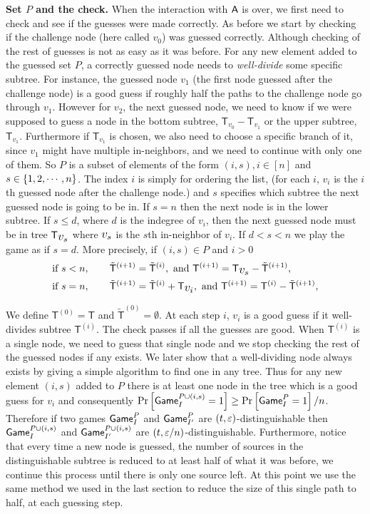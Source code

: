 \documentclass{article}
\def\A{{\sf A}}
\newcommand{\game}{{\sf Game}}
\newcommand{\T}{{\mathsf T}}
\newcommand{\dgg}[2]{\game_{#1}^{#2}}
\newcommand{\dT}{{\mathsf{T}}}
\newcommand{\bigv}[1]{\mbox{\large $v_{#1}$}}
\newcommand{\bigt}[1]{{\dT}^{({#1})}}
\newcommand{\bigtb}[1]{\tilde{\dT}^{({#1})}}
\begin{document}
  \textbf{Set $P$ and the check.} When the interaction with $\A$ is over, we first need to check and see if the guesses were made correctly. As before we start by checking if the challenge node (here called $v_0$) was guessed correctly. Although checking of the rest of guesses is not as easy as it was before. For any new element added to the guessed set $P$, a correctly guessed node needs to \textit{well-divide} some specific subtree. For instance, the guessed node $v_1$ (the first node guessed after the challenge node) is a good guess if roughly half the paths to the challenge node go through $v_1$. However for $v_2$, the next guessed node, we need to know if we were supposed to guess a node in the bottom subtree, $\T_{v_0}-\T_{v_1}$ or the upper subtree, $\T_{v_1}$. Furthermore if $\T_{v_1}$ is chosen, we also need to choose a specific branch of it, since $v_1$ might have multiple in-neighbors, and we need to continue with only one of them. So $P$ is a subset of elements of the form $(i,s), i\in [n]$ and $s \in \left\{ 1,2,\cdots,n \right\}$. The index $i$ is simply for ordering the list, (for each $i$, $v_i$ is the $i$th guessed node after the challenge node.) and $s$ specifies which subtree the next guessed node is going to be in. If $s=n$ then the next node is in the lower subtree. If $s\leq d$, where $d$ is the indegree of $v_i$, then the next guessed node must be in tree $\T_{\bigv{s} }$ where $\bigv{s}$ is the $s$th in-neighbor of $v_i$. If $d<s<n$ we play the game as if $s=d$. More precisely, if $(i,s)\in P$ and $i>0$
  \begin{align*}
&\text{if } s<n, \qquad \bigtb{i+1}=\bigtb{i}, \text{ and }\bigt{i+1}=\T_{\bigv{s}}-\bigtb{i+1}, \\
&\text{if } s=n, \qquad \bigtb{i+1}=\bigtb{i}+\T_{\bigv{i}}, \text{ and }\bigt{i+1}=\bigt{i}- \bigtb{i+1}, 
  \end{align*}

 We define $\bigt{0}=\T$ and $\bigtb{0}=\emptyset$. At each step $i$, $v_i$ is a good guess if it well-divides subtree $\bigt{i}$. The check passes if all the guesses are good. When $\bigt{i}$ is a single node, we need to guess that single node and we stop checking the rest of the guessed nodes if any exists. We later show that a well-dividing node always exists by giving a simple algorithm to find one in any tree. Thus for any new element $(i,s)$ added to $P$ there is at least one node in the tree which is a good guess for $v_i$ and consequently $\prob{\game_{I}^{P\cup (i,s) }=1}\geq \prob{\dgg{I}{P}=1}/n$. Therefore if two games $ \dgg{I}{P}$ and $\dgg{I'}{P}$ are $(t,\varepsilon)$-distinguishable then $ \game_{I}^{P\cup (i,s) }$ and $\game_{I'}^{P\cup (i,s)}$ are $(t,\varepsilon/n)$-distinguishable. Furthermore, notice that every time a new node is guessed, the number of sources in the distinguishable subtree is reduced to at least half of what it was before, we continue this process until  there is only one source left. At this point we use the same method we used in the last section to reduce the size of this single path to half, at each guessing step. \\
\end{document}
